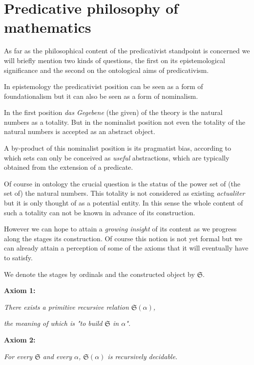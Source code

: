 \documentclass[12pt]{article}
\begin{document}
\section{Predicative philosophy of mathematics}\normalsize

As far as the philosophical content of the predicativist standpoint is concerned we will briefly mention two kinds of questions, the first on its epistemological significance and the second on the ontological aims of predicativism.

In epistemology the predicativist position can be seen as a form of foundationalism but it can also be seen as a form of nominalism.

In the first position \emph{das Gegebene} (the given) of the theory is the natural numbers as a totality. But in the nominalist position not even the totality of the natural numbers is accepted as an abstract object. 

A by-product of this nominalist position is its pragmatist bias, according to which sets can only be conceived as \emph{useful} abstractions, which are typically obtained from the extension of a predicate.

Of course in ontology the crucial question is the status of the power set of (the set of) the natural numbers. This totality is not considered as existing \emph{actualiter} but it is only thought of as a potential entity. In this sense the whole content of such a totality can not be known in advance of its construction.

However we can hope to attain a \emph{growing insight} of its content as we progress along the stages its construction. Of course this notion is not yet formal but we can already attain a perception of some of the axioms that it will eventually have to satisfy.

We denote the stages by ordinals and the constructed object by $\mathfrak{S}.$
 
\quad \textbf{Axiom 1:}

\begin{center}
\emph{There exists a primitive recursive relation $\mathfrak{S} (\alpha)$,} 

\emph{the meaning of which is "to build $\mathfrak{S}$ in $\alpha$".}
\end{center}

\quad \textbf{Axiom 2:}

\begin{center}
\emph{For every $\mathfrak{S}$ and every $\alpha$, $\mathfrak{S} (\alpha)$ is recursively decidable.}
\end{center}
\end{document}
